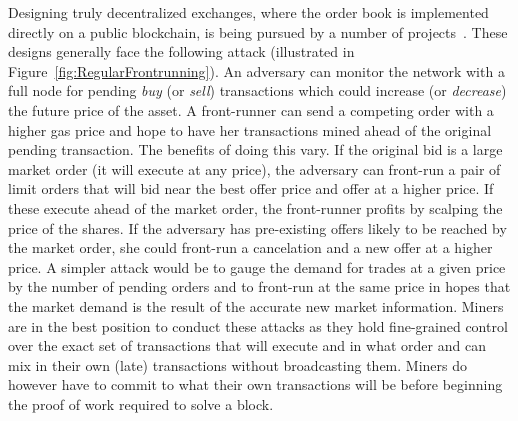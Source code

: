 Designing truly decentralized exchanges, where the order book is implemented directly on a public blockchain, is being pursued by a number of projects~\cite{inDEXgithub}. These designs generally face the following attack (illustrated in Figure~\ref{fig:RegularFrontrunning}). An adversary can monitor the network with a full node for pending \textit{buy} (or \textit{sell}) transactions which could increase (or \textit{decrease}) the future price of the asset. A front-runner can send a competing order with a higher gas price and hope to have her transactions mined ahead of the original pending transaction. The benefits of doing this vary. If the original bid is a large market order (\ie it will execute at any price), the adversary can front-run a pair of limit orders that will bid near the best offer price and offer at a higher price. If these execute ahead of the market order, the front-runner profits by scalping the price of the shares. If the adversary has pre-existing offers likely to be reached by the market order, she could front-run a cancelation and a new offer at a higher price. A simpler attack would be to gauge the demand for trades at a given price by the number of pending orders and to front-run at the same price in hopes that the market demand is the result of the accurate new market information. Miners are in the best position to conduct these attacks as they hold fine-grained control over the exact set of transactions that will execute and in what order and can mix in their own (late) transactions without broadcasting them. Miners do however have to commit to what their own transactions will be before beginning the proof of work required to solve a block. 


